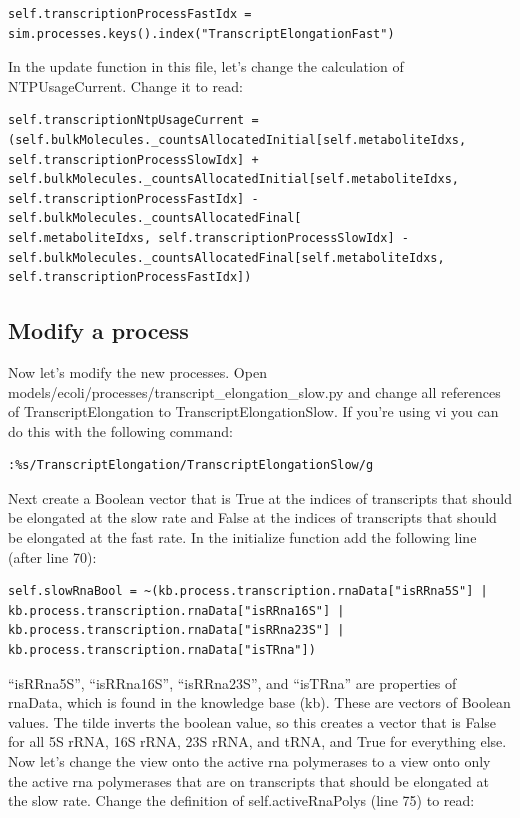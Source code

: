 \documentclass[12pt]{article}
\begin{document}
\begin{lstlisting}
self.transcriptionProcessFastIdx = sim.processes.keys().index("TranscriptElongationFast")
\end{lstlisting}

In the update function in this file, let’s change the calculation of NTPUsageCurrent. Change it to read: 

\begin{lstlisting}
self.transcriptionNtpUsageCurrent = (self.bulkMolecules._countsAllocatedInitial[self.metaboliteIdxs, self.transcriptionProcessSlowIdx] + self.bulkMolecules._countsAllocatedInitial[self.metaboliteIdxs, self.transcriptionProcessFastIdx] - self.bulkMolecules._countsAllocatedFinal[
self.metaboliteIdxs, self.transcriptionProcessSlowIdx] - self.bulkMolecules._countsAllocatedFinal[self.metaboliteIdxs, self.transcriptionProcessFastIdx])
\end{lstlisting}

\subsection{Modify a process}

Now let’s modify the new processes. Open models/ecoli/processes/transcript\_elongation\_slow.py and change all references of TranscriptElongation to TranscriptElongationSlow. If you’re using vi you can do this with the following command:

\lstset{language=bash}
\begin{lstlisting}
:%s/TranscriptElongation/TranscriptElongationSlow/g
\end{lstlisting}

Next create a Boolean vector that is True at the indices of transcripts that should be elongated at the slow rate and False at the indices of transcripts that should be elongated at the fast rate. In the initialize function add the following line (after line 70):

\lstset{language=Python}
\begin{lstlisting}
self.slowRnaBool = ~(kb.process.transcription.rnaData["isRRna5S"] | kb.process.transcription.rnaData["isRRna16S"] | kb.process.transcription.rnaData["isRRna23S"] | kb.process.transcription.rnaData["isTRna"])
\end{lstlisting}

“isRRna5S”, “isRRna16S”, “isRRna23S”, and “isTRna” are properties of rnaData, which is found in the knowledge base (kb). These are vectors of Boolean values. The tilde inverts the boolean value, so this creates a vector that is False for all 5S rRNA, 16S rRNA, 23S rRNA, and tRNA, and True for everything else.
Now let’s change the view onto the active rna polymerases to a view onto only the active rna polymerases that are on transcripts that should be elongated at the slow rate. Change the definition of self.activeRnaPolys (line 75) to read:
\end{document}
